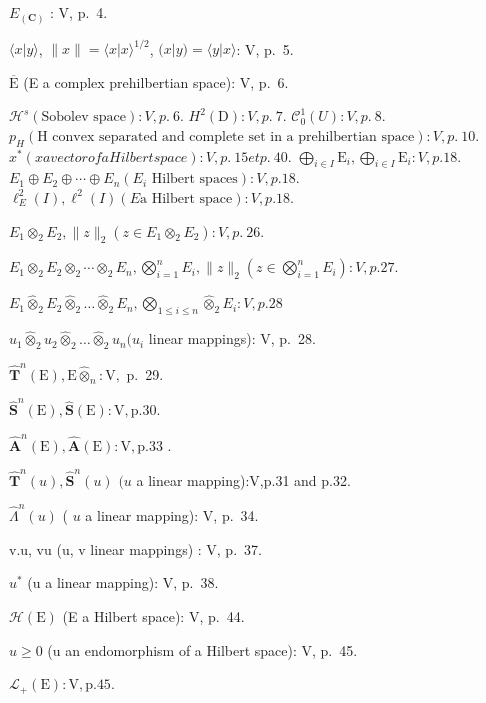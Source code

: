 \(E_{(\mathbf{C})}\) : V, p.~4.

\(\langle x|y\rangle\), \(\|x\| = \langle x|x\rangle^{1/2}\), \((x|y) = \langle y|x\rangle\): V, p.~5.

\(\overline{\mathrm{E}}\) (E a complex prehilbertian space): V, p.~6.

\(\mathcal{H}^{s} (\text {Sobolev space}): V, p.~6.\) \(H^{2}(\text {D}): V, p.~7.\) \(\mathcal{C}_{0}^{1}(U): V, p.~8.\) \(p_{H} (\text {H convex separated and complete set in a prehilbertian space}): V, p.~10.\) \(x^{*} (x a vector of a Hilbert space): V, p.~15 et p.~40.\) \(\bigoplus_{i\in I}\mathrm{E}_{i},\bigoplus_{i\in I}\mathrm{E}_{i}:V,p.18.\) \(E_{1}\oplus E_{2}\oplus\cdots\oplus E_{n} (E_{i}\text { Hilbert spaces}):V,p.18.\) \(\ell_{E}^{2}(I),\ell^{2}(I)(E\text {a Hilbert space}):V,p.18.\)

\(E_{1} \otimes_{2} E_{2}, \|z\|_{2} (z \in E_{1} \otimes_{2} E_{2}) : V, p.~26.\)

\(E_{1} \otimes_{2} E_{2} \otimes_{2} \cdots \otimes_{2} E_{n}, \bigotimes_{i=1}^{n} E_{i}, \|z\|_{2} \left( z \in \bigotimes_{i=1}^{n} E_{i} \right) : V, p. 27.\)

\(E_{1} \hat{\otimes}_{2} E_{2} \hat{\otimes}_{2} \ldots \hat{\otimes}_{2} E_{n}, \bigotimes_{1 \leqslant i \leqslant n} \hat{\otimes}_{2} E_{i}: V, p. 28\)

\(u_{1}\hat{\otimes}_{2}u_{2}\hat{\otimes}_{2}\ldots \hat{\otimes}_{2}u_{n}(u_{i}\) linear mappings): V, p.~28.

\(\hat{\mathbf{T}}^n (\mathrm{E}),\mathrm{E}\hat{\otimes}_n:\mathrm{V},\) p.~29.

\(\hat{\mathbf{S}}^{n}(\mathrm{E}), \hat{\mathbf{S}}(\mathrm{E}) : \mathrm{V}, \mathrm{p.} 30.\)

\(\hat{\mathbf{A}}^{n}(\mathrm{E}), \hat{\mathbf{A}}(\mathrm{E}) : \mathrm{V}, \mathrm{p. 33}\) .

\(\hat{\mathbf{T}}^n (u),\hat{\mathbf{S}}^n (u)\) \((u\) a linear mapping):V,p.31 and p.32.

\(\hat{\Lambda}^n (u)\) ( \(u\) a linear mapping): V, p.~34.

v.u, vu (u, v linear mappings) : V, p.~37.

\(u^{*}\) (u a linear mapping): V, p.~38.

\(\mathcal{H}(\mathrm{E})\) (E a Hilbert space): V, p.~44.

\(u \geqslant 0\) (u an endomorphism of a Hilbert space): V, p.~45.

\(\mathcal{L}_{+}(\mathrm{E}):\mathrm{V},\mathrm{p.}45.\)

